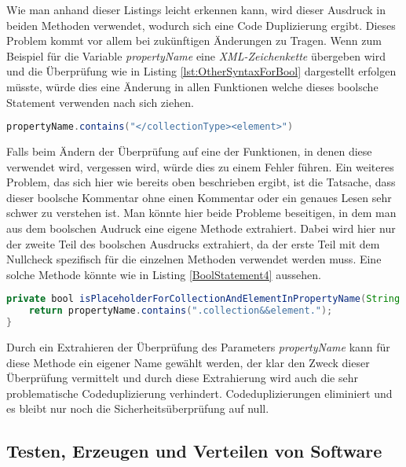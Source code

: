 \SuperPar Wie man anhand dieser Listings leicht erkennen kann, wird dieser Ausdruck in beiden Methoden verwendet, wodurch sich eine Code Duplizierung ergibt. Dieses Problem kommt vor allem bei zukünftigen Änderungen zu Tragen. Wenn zum Beispiel für die Variable \textit{propertyName} eine \textit{XML-Zeichenkette} übergeben wird und die Überprüfung wie in Listing \ref{lst:OtherSyntaxForBool} dargestellt erfolgen müsste, würde dies eine Änderung in allen Funktionen welche dieses boolsche Statement verwenden nach sich ziehen. 

\begin{lstlisting}[language=Java, caption=Boolscher Ausdruck neu, label=lst:BoolStatement4]
 propertyName.contains("</collectionType><element>")
\end{lstlisting}

\SuperPar Falls beim Ändern der Überprüfung auf eine der Funktionen, in denen diese verwendet wird, vergessen wird, würde dies zu einem Fehler führen. Ein weiteres Problem, das sich hier wie bereits oben beschrieben ergibt, ist die Tatsache, dass dieser boolsche Kommentar ohne einen Kommentar oder ein genaues Lesen sehr schwer zu verstehen ist. Man könnte hier beide Probleme beseitigen, in dem man aus dem boolschen Audruck eine eigene Methode extrahiert. Dabei wird hier nur der zweite Teil des boolschen Ausdrucks extrahiert, da der erste Teil mit dem Nullcheck spezifisch für die einzelnen Methoden verwendet werden muss. Eine solche Methode könnte wie in Listing \ref{BoolStatement4} aussehen.

\begin{lstlisting}[language=Java, caption=Boolscher Ausdruck neu, label=lst:BoolStatement4]
private bool isPlaceholderForCollectionAndElementInPropertyName(String propertyName) {
	return propertyName.contains(".collection&&element.");
}
\end{lstlisting}

Durch ein Extrahieren der Überprüfung des Parameters \textit{propertyName} kann für diese Methode ein eigener Name gewählt werden, der klar den Zweck dieser Überprüfung vermittelt und durch diese Extrahierung wird auch die sehr problematische Codeduplizierung verhindert. Codeduplizierungen eliminiert und es bleibt nur noch die Sicherheitsüberprüfung auf null.

\subsection{Testen, Erzeugen und Verteilen von Software}

